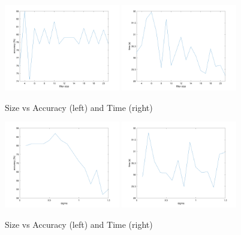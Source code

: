 \begin{figure}[h!]
	\centering
	\includegraphics[width=0.45\textwidth]{../code/size_vs_acc.png}
	\includegraphics[width=0.45\textwidth]{../code/size_vs_time.png}
	\caption{Size vs Accuracy (left) and Time (right)}
	\label{fig:size_comp}
\end{figure}

\begin{figure}[h!]
	\centering
	\includegraphics[width=0.45\textwidth]{../code/sigma_vs_acc.png}
	\includegraphics[width=0.45\textwidth]{../code/sigma_vs_time.png}
	\caption{Size vs Accuracy (left) and Time (right)}
	\label{fig:sigma_comp}
\end{figure}


